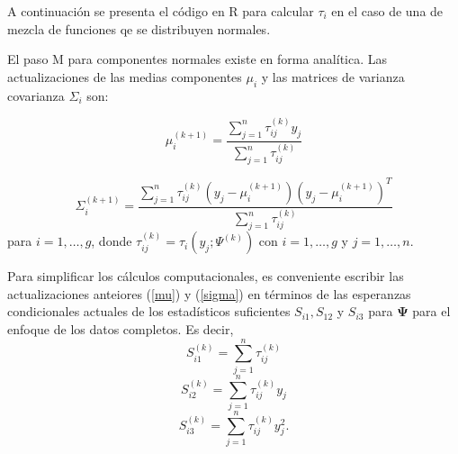 \documentclass[
]{article}
\newenvironment{Shaded}{\begin{snugshade}}{\end{snugshade}}
\newcommand{\AttributeTok}[1]{\textcolor[rgb]{0.77,0.63,0.00}{#1}}
\newcommand{\ConstantTok}[1]{\textcolor[rgb]{0.00,0.00,0.00}{#1}}
\newcommand{\ControlFlowTok}[1]{\textcolor[rgb]{0.13,0.29,0.53}{\textbf{#1}}}
\newcommand{\DecValTok}[1]{\textcolor[rgb]{0.00,0.00,0.81}{#1}}
\newcommand{\FunctionTok}[1]{\textcolor[rgb]{0.00,0.00,0.00}{#1}}
\newcommand{\NormalTok}[1]{#1}
\newcommand{\OtherTok}[1]{\textcolor[rgb]{0.56,0.35,0.01}{#1}}
\newcommand{\SpecialCharTok}[1]{\textcolor[rgb]{0.00,0.00,0.00}{#1}}
\begin{document}
A continuación se presenta el código en R para calcular \(\tau_i\) en el
caso de una de mezcla de funciones qe se distribuyen normales.

\begin{Shaded}
\end{Shaded}

El paso M para componentes normales existe en forma analítica. Las
actualizaciones de las medias componentes \(\mu_i\) y las matrices de
varianza covarianza \(\Sigma_i\) son:

\begin{equation}
\mu_i^{(k+1)}=\frac{\sum_{j=1}^n \tau_{ij}^{(k)}y_j}{\sum_{j=1}^n\tau_{ij}^{(k)}}\label{mu}
\end{equation}

\begin{equation}
\Sigma_i^{(k+1)}=\frac{\sum_{j=1}^n \tau_{ij}^{(k)}(y_j-\mu_i^{(k+1)})(y_j-\mu_i^{(k+1)})^T}{\sum_{j=1}^n \tau_{ij}^{(k)}}\label{sigma}
\end{equation} para \(i=1,\ldots,g\), donde
\(\tau_{ij}^{(k)}=\tau_i(y_j;\Psi^{(k)})\) con \(i=1,\ldots,g\) y
\(j=1,\ldots,n\).

Para simplificar los cálculos computacionales, es conveniente escribir
las actualizaciones anteiores (\ref{mu}) y (\ref{sigma}) en términos de
las esperanzas condicionales actuales de los estadísticos suficientes
\(S_{i1}, S_{12}\) y \(S_{i3}\) para \(\bm{\Psi}\) para el enfoque de
los datos completos. Es decir,
\[ S_{i1}^{(k)}=\sum_{j=1}^{n} \tau_{ij}^{(k)}\]
\[ S_{i2}^{(k)}=\sum_{j=1}^{n} \tau_{ij}^{(k)}y_j\]
\[ S_{i3}^{(k)}=\sum_{j=1}^{n} \tau_{ij}^{(k)}y_j^2.\]
\end{document}
